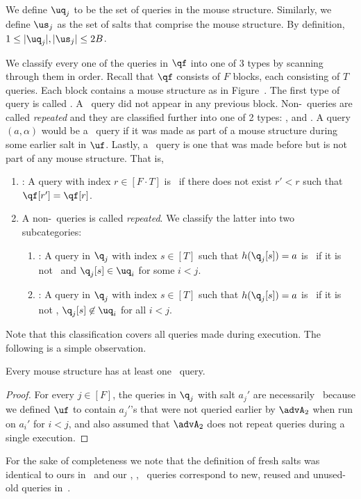   
We define $\uq_j$ to be the set of queries in the mouse structure. Similarly, we define  $\us_j$ as the set of salts that comprise the mouse structure. By definition, $1\leq |\uq_j|, |\us_j|\leq 2B$. 

 We classify every one of the queries in $\qf$ into one of 3 types by scanning through them in order. Recall that $\qf$ consists of $F$ blocks, each consisting of $T$ queries. Each block contains a mouse structure as in Figure~.
The first type of query is called \new. A \new\ query did not appear in any previous block. Non-\new\ queries are called \emph{repeated} and they are classified further into one of 2 types: \frep, and \urep. A query $(a,\alpha)$ would be a \frep\ query if it was made as part of a mouse structure during some earlier salt in $\uf$. Lastly, a \urep\ query is one that was made before but is not part of any mouse structure. That is,
\begin{enumerate}
\item \new: A query with index $r\in [F\cdot T]$ is \new\ if there does not exist $r'<r$ such that $\qf[r']=\qf[r]$. 
\item A non-\new\ queries is called \emph{repeated}. We classify the latter into two subcategories:
\begin{enumerate}
\item \frep: 
A query in $\q_j$ with index $s\in [T]$ such that $h(\q_j[s])=a$ is \frep\ if it is not \new\ and $\q_j[s]\in \uq_i$ for some $i<j$.
\item \urep: A query in $\q_j$ with index $s\in [T]$ such that $h(\q_j[s])=a$ is  \urep\  if it is not \new, $\q_j[s]\not\in \uq_i$ for all $i<j$.
\end{enumerate}
\end{enumerate}
Note that this classification covers all queries made during execution. The following is a simple observation.
\begin{myclaim}\label{claim:onenew}
Every mouse structure has at least one \new\ query.
\end{myclaim}
\begin{proof}
For every $j\in [F]$, the queries in $\q_j$ with salt $a_j'$ are necessarily \new\ because we defined $\uf$ to contain $a_j'$'s that were not queried earlier by $\advA_2$ when run on $a_i'$ for $i<j$, and also assumed that $\advA_2$ does not repeat queries during a single execution.
\end{proof}
For the sake of completeness we note that the definition of fresh salts was identical to ours in~\cite{AkshimaCDW20} and our \new, \frep, \urep\ queries correspond to new, reused and unused-old queries in~\cite{AkshimaCDW20}.


